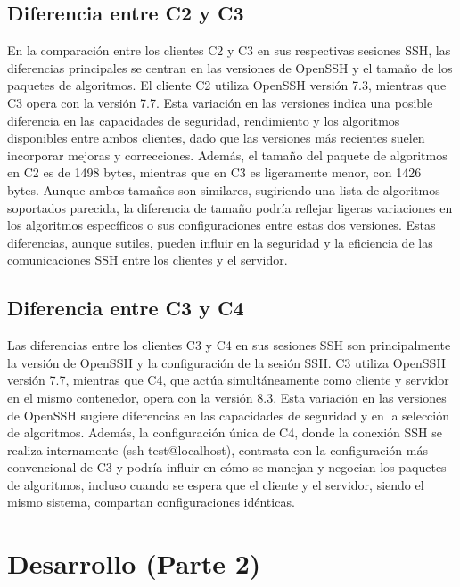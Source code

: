 \documentclass[letter,12pt]{article}
\begin{document}
\subsection{Diferencia entre C2 y C3}
En la comparación entre los clientes C2 y C3 en sus respectivas sesiones SSH, las diferencias principales se centran en las versiones de OpenSSH y el tamaño de los paquetes de algoritmos. El cliente C2 utiliza OpenSSH versión 7.3, mientras que C3 opera con la versión 7.7. Esta variación en las versiones indica una posible diferencia en las capacidades de seguridad, rendimiento y los algoritmos disponibles entre ambos clientes, dado que las versiones más recientes suelen incorporar mejoras y correcciones. Además, el tamaño del paquete de algoritmos en C2 es de 1498 bytes, mientras que en C3 es ligeramente menor, con 1426 bytes. Aunque ambos tamaños son similares, sugiriendo una lista de algoritmos soportados parecida, la diferencia de tamaño podría reflejar ligeras variaciones en los algoritmos específicos o sus configuraciones entre estas dos versiones. Estas diferencias, aunque sutiles, pueden influir en la seguridad y la eficiencia de las comunicaciones SSH entre los clientes y el servidor.
\subsection{Diferencia entre C3 y C4}
Las diferencias entre los clientes C3 y C4 en sus sesiones SSH son principalmente la versión de OpenSSH y la configuración de la sesión SSH. C3 utiliza OpenSSH versión 7.7, mientras que C4, que actúa simultáneamente como cliente y servidor en el mismo contenedor, opera con la versión 8.3. Esta variación en las versiones de OpenSSH sugiere diferencias en las capacidades de seguridad y en la selección de algoritmos. Además, la configuración única de C4, donde la conexión SSH se realiza internamente (ssh test@localhost), contrasta con la configuración más convencional de C3 y podría influir en cómo se manejan y negocian los paquetes de algoritmos, incluso cuando se espera que el cliente y el servidor, siendo el mismo sistema, compartan configuraciones idénticas.
\section{Desarrollo (Parte 2)}
\end{document}
